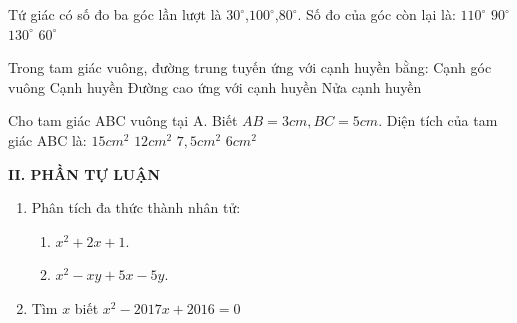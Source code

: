 \begin{ex}%
	Tứ giác có số đo ba góc lần lượt là $30^\circ$,$100^\circ$,$80^\circ$. Số đo của góc còn lại là:
	\choice
	{$110^\circ$}
	{$90^\circ$}
	{ \True $130^\circ$}
	{$60^\circ$}
\end{ex}
\begin{ex}%
	Trong tam giác vuông, đường trung tuyến ứng với cạnh huyền bằng:
	\choice
	{Cạnh góc vuông}
	{Cạnh huyền}
	{ Đường cao ứng với cạnh huyền}
	{ \True Nửa cạnh huyền}
	\loigiai{ }
\end{ex}
\begin{ex}%
	Cho tam giác ABC vuông tại A. Biết $AB = 3cm, BC = 5cm.$ Diện tích của tam giác ABC là:
	\choice
	{$15cm^2$}
	{$12cm^2$}
	{$7,5cm^2$}
	{ \True $6cm^2$}
\end{ex}
\noindent\textbf{II. PHẦN TỰ LUẬN}
\setcounter{ex}{0}
\begin{ex}%
\begin{enumerate}
\item Phân tích đa thức thành nhân tử:
\begin{enumerate}
\item $x^2+2x+1$.
\item $x^2-xy+5x-5y$.
\end{enumerate}
\item Tìm $x$ biết $x^2 -2017x+2016=0$
\end{enumerate}
\end{ex}
